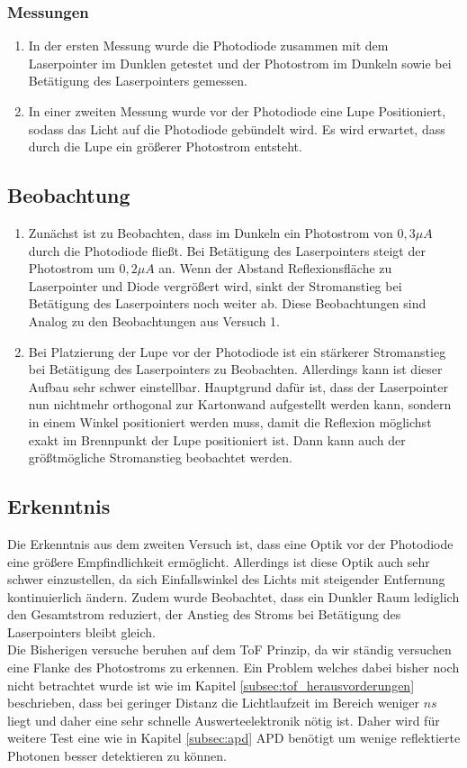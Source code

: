 \subsubsection{Messungen}
\begin{enumerate}
	\item In der ersten Messung wurde die Photodiode zusammen mit dem Laserpointer im Dunklen getestet und der Photostrom im Dunkeln sowie bei Betätigung des Laserpointers gemessen.
	\item In einer zweiten Messung wurde vor der Photodiode eine Lupe Positioniert, sodass das Licht auf die Photodiode gebündelt wird. Es wird erwartet, dass durch die Lupe ein größerer Photostrom entsteht.
\end{enumerate}
\subsection{Beobachtung}
\begin{enumerate}
	\item Zunächst ist zu Beobachten, dass im Dunkeln ein Photostrom von $0,3\mu A$ durch die Photodiode fließt. Bei Betätigung des Laserpointers steigt der Photostrom um $0,2\mu A$ an. Wenn der Abstand Reflexionsfläche zu Laserpointer und Diode vergrößert wird, sinkt der Stromanstieg bei Betätigung des Laserpointers noch weiter ab. Diese Beobachtungen sind Analog zu den Beobachtungen aus Versuch 1.
	\item Bei Platzierung der Lupe vor der Photodiode ist ein stärkerer Stromanstieg bei Betätigung des Laserpointers zu Beobachten. Allerdings kann ist dieser Aufbau sehr schwer einstellbar. Hauptgrund dafür ist, dass der Laserpointer nun nichtmehr orthogonal zur Kartonwand aufgestellt werden kann, sondern in einem Winkel positioniert werden muss, damit die Reflexion möglichst exakt im Brennpunkt der Lupe positioniert ist. Dann kann auch der größtmögliche Stromanstieg beobachtet werden. 
\end{enumerate}
\subsection{Erkenntnis}
Die Erkenntnis aus dem zweiten Versuch ist, dass eine Optik vor der Photodiode eine größere Empfindlichkeit ermöglicht. Allerdings ist diese Optik auch sehr schwer einzustellen, da sich Einfallswinkel des Lichts mit steigender Entfernung kontinuierlich ändern. Zudem wurde Beobachtet, dass ein Dunkler Raum lediglich den Gesamtstrom reduziert, der Anstieg des Stroms bei Betätigung des Laserpointers bleibt gleich.\\
Die Bisherigen versuche beruhen auf dem \ac{ToF} Prinzip, da wir ständig versuchen eine Flanke des Photostroms zu erkennen. Ein Problem welches dabei bisher noch nicht betrachtet wurde ist wie im Kapitel \ref{subsec:tof_herausvorderungen} beschrieben, dass bei geringer Distanz die Lichtlaufzeit im Bereich weniger $ns$ liegt und daher eine sehr schnelle Auswerteelektronik nötig ist. Daher wird für weitere Test eine wie in Kapitel \ref{subsec:apd} \ac{APD} benötigt um wenige reflektierte Photonen besser detektieren zu können.
